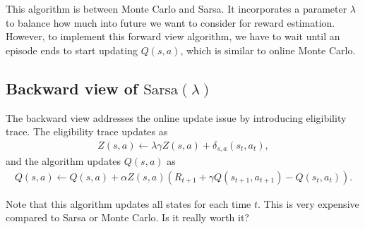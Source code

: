 \documentclass[onecolumn, 12pt]{IEEEtran}
\newcommand\1[1]{\mathbb{I}_{\left\{#1\right\}}}
\begin{document}
This algorithm is between Monte Carlo and Sarsa. It incorporates a parameter $\lambda$ to balance how much into future we want to consider for reward estimation. However, to implement this forward view algorithm, we have to wait until an episode ends to start updating $Q(s, a)$, which is similar to online Monte Carlo.

\subsection{Backward view of $\text{Sarsa}(\lambda)$}
The backward view addresses the online update issue by introducing eligibility trace. The eligibility trace updates as
\begin{align*}
  Z(s, a) \leftarrow \lambda \gamma Z(s, a) + \delta_{s, a}(s_t, a_t),
\end{align*}
and the algorithm updates $Q(s, a)$ as
\begin{align*}
  Q(s, a) \leftarrow Q(s, a) + \alpha Z(s, a)(R_{t + 1} + \gamma Q(s_{t + 1}, a_{t + 1}) - Q(s_t, a_t)). 
\end{align*}

Note that this algorithm updates all states for each time $t$. This is very expensive compared to Sarsa or Monte Carlo. Is it really worth it?
\end{document}
